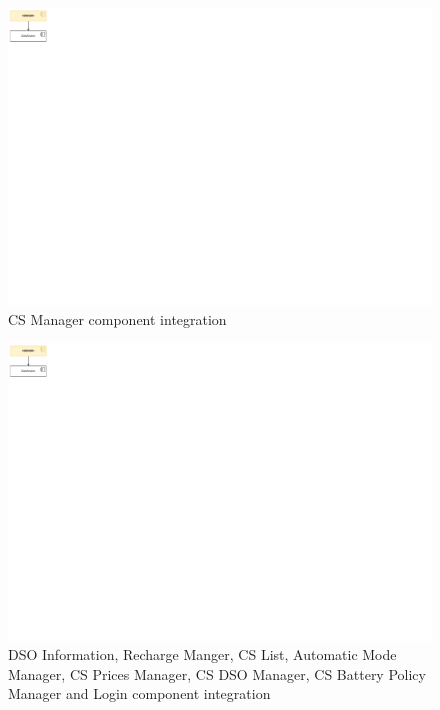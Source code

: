 \documentclass[11pt]{article}
\begin{document}
\newpage

\begin{figure}[!ht]
    \centering
    \includegraphics[page={7}, trim=0cm 28.5cm 36.5cm 0cmm, width=0.7\linewidth, clip]{IntegrationDiagram.pdf}
    \caption{CS Manager component integration}
\end{figure}

\begin{figure}[!ht]
    \centering
    \includegraphics[page={8}, trim=0cm 25.5cm 14cm 0cmm, width=\linewidth, clip]{IntegrationDiagram.pdf}
    \caption{DSO Information, Recharge Manger, CS List, Automatic Mode Manager, CS Prices Manager, CS DSO Manager, CS Battery Policy Manager and Login component integration}
\end{figure}
\end{document}
